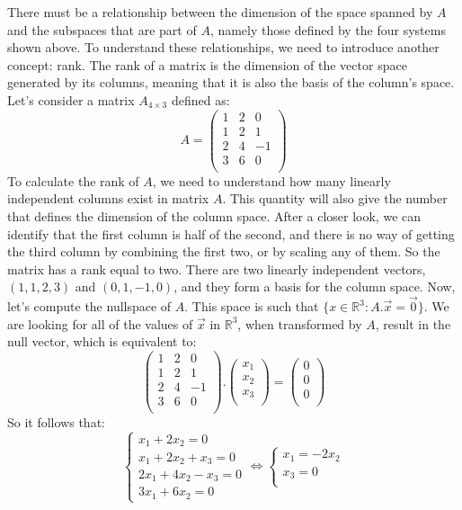 \documentclass[600paper, 11pt,twoside,openany]{kdp}
\begin{document}
\par 
\vspace{-3pt}
\indent There must be a relationship between the dimension of the space spanned by $A$ and the subspaces that are part of $A$, namely those defined by the four systems shown above. To understand these relationships, we need to introduce another concept: rank. The rank of a matrix is the dimension of the vector space generated by its columns, meaning that it is also the basis of the column’s space. Let’s consider a matrix $A_{4 \times 3}$ defined as:
\[
A = \begin{pmatrix}
1 & 2 & 0 \\
1 & 2 & 1 \\
2 & 4 & -1 \\
3 & 6 & 0 \\
\end{pmatrix}
\]
\indent To calculate the rank of $A$, we need to understand how many linearly independent columns exist in matrix $A$. This quantity will also give the number that defines the dimension of the column space. After a closer look, we can identify that the first column is half of the second, and there is no way of getting the third column by combining the first two, or by scaling any of them. So the matrix has a rank equal to two. There are two linearly independent vectors, $(1,1,2,3)$ and $(0,1,−1,0)$, and they form a basis for the column space. Now, let’s compute the nullspace of $A$. This space is such that  $\lbrace x \in \mathbb{R}^3: A.\overrightarrow{x} = \overrightarrow{0} \rbrace$. We are looking for all of the values of $\overrightarrow{x}$ in $\mathbb{R}^3$, when transformed by $A$, result in the null vector, which is equivalent to:
\[
\begin{pmatrix}
1 & 2 & 0 \\
1 & 2 & 1 \\
2 & 4 & -1 \\
3 & 6 & 0 \\
\end{pmatrix} . \begin{pmatrix}
x_1\\
x_2\\
x_3\\
\end{pmatrix} = \begin{pmatrix}
0\\
0\\
0\\
\end{pmatrix}
\]
\indent So it follows that:
\[
    \begin{cases}
     x_1 + 2x_2  = 0\\
     x_1 + 2x_2 + x_3 = 0 \\
     2x_1 + 4x_2 - x_3 = 0 \\
     3x_1 + 6x_2 = 0
    \end{cases} \Leftrightarrow \begin{cases}
     x_1 = -2x_2 \\
     x_3 = 0 \\
    \end{cases}
\]
\end{document}
